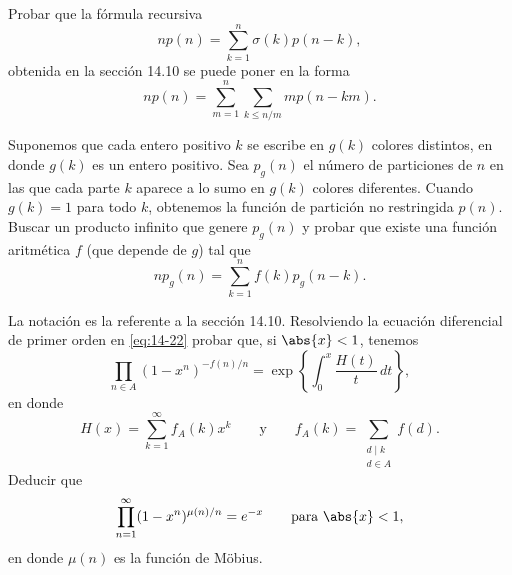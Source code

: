 \documentclass[12pt,a4paper]{book}
\begin{document}
    \begin{ejercicio}
        Probar que la fórmula recursiva
        \begin{equation*}
            np(n)=\sum_{k=1}^{n}\sigma(k)p(n-k),
        \end{equation*}
        obtenida en la sección 14.10 se puede poner en la forma
        \begin{equation*}
            np(n)=\sum_{m=1}^{n}\sum_{k\leq n/m}mp(n-km).
        \end{equation*}
    \end{ejercicio}

    \begin{ejercicio}
        Suponemos que cada entero positivo $k$ se escribe en $g(k)$ colores distintos, en donde
        $g(k)$ es un entero positivo. Sea $p_{g}(n)$ el número de particiones de $n$ en las que
        cada parte $k$ aparece a lo sumo en $g(k)$ colores diferentes. Cuando $g(k)=1$ para todo
        $k$, obtenemos la función de partición no restringida $p(n)$. Buscar un producto
        infinito que genere $p_{g}(n)$ y probar que existe una función aritmética $f$ (que depende
        de $g$) tal que
        \begin{equation*}
            np_{g}(n)=\sum_{k=1}^{n}f(k)p_{g}(n-k).
        \end{equation*}
    \end{ejercicio}

    \begin{ejercicio}
        La notación es la referente a la sección 14.10. Resolviendo la ecuación diferencial de
        primer orden en \eqref{eq:14-22} probar que, si $\abs{x}<1$, tenemos
        \begin{equation*}
            \prod_{n\in A}(1-x^{n})^{-f(n)/n}=\exp\left\{\int_{0}^{x}\frac{H(t)}{t}\,dt\right\},
        \end{equation*}
        en donde
        \begin{equation*}
            H(x)=\sum_{k=1}^{\infty}f_{A}(k)x^{k}\qquad\text{y}\qquad f_{A}(k)=\sum_{\substack{d\mid k\\d\in A}}f(d).
        \end{equation*}
        Deducir que
        \begin{equation*}
            \prod_{n=1}^{\infty}(1-x^{n})^{\mu(n)/n}=e^{-x}\qquad\text{para }\abs{x}<1,
        \end{equation*}
        en donde $\mu(n)$ es la función de Möbius.
    \end{ejercicio}
\end{document}
